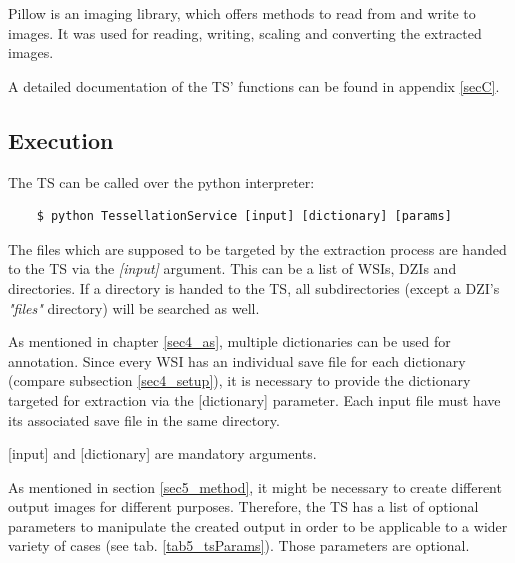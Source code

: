 Pillow is an imaging library, which offers methods to read from and write to images. It was used for reading, writing, scaling and converting the extracted images.

A detailed documentation of the TS' functions can be found in appendix \ref{secC}.

\subsection{Execution}

The TS can be called over the python interpreter:

\begin{lstlisting}
	$ python TessellationService [input] [dictionary] [params]
\end{lstlisting}

The files which are supposed to be targeted by the extraction process are handed to the TS via the \emph{[input]} argument. This can be a list of WSIs, DZIs and directories. If a directory is handed to the TS, all subdirectories (except a DZI's \emph{"{\textunderscore}files"} directory) will be searched as well.

As mentioned in chapter \ref{sec4_as}, multiple dictionaries can be used for annotation. Since every WSI has an individual save file for each dictionary (compare subsection \ref{sec4_setup}), it is necessary to provide the dictionary targeted for extraction via the [dictionary] parameter. Each input file must have its associated save file in the same directory.

[input] and [dictionary] are mandatory arguments.

As mentioned in section \ref{sec5_method}, it might be necessary to create different output images for different purposes. Therefore, the TS has a list of optional parameters to manipulate the created output in order to be applicable to a wider variety of cases (see tab. \ref{tab5_tsParams}). Those parameters are optional. 

